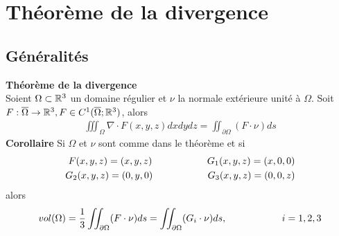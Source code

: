 \chapter[Théorème de la divergence]{Théorème de la divergence}

\section{Généralités}

\begin{myTheorem} {\bf Théorème de la divergence}
\\
	Soient $\Omega \subset \mathbb{R}^3$ un domaine régulier et $\nu$ la normale extérieure unité à $\Omega$. Soit $F:\overline{\Omega}\rightarrow\mathbb{R}^3, F\in C^1(\overline{\Omega};\mathbb{R}^3)$, alors
	\begin{eqnarray*}
		\iiint_\Omega \nabla\cdot F(x,y,z)dxdydz=\iint_{\partial\Omega}(F\cdot\nu)ds
	\end{eqnarray*}
	{\bf Corollaire} Si $\Omega$ et $\nu$ sont comme dans le théorème et si
	\begin{eqnarray*}
		F(x,y,z)=(x,y,z)\hspace{20 mm}G_1(x,y,z)=(x,0,0)
		\\
		G_2(x,y,z)=(0,y,0)\hspace{20 mm}G_3(x,y,z)=(0,0,z)
	\end{eqnarray*}
	alors
	\begin{eqnarray*}
		vol(\Omega)=\frac{1}{3}\iint_{\partial\Omega}(F\cdot\nu)ds=\iint_{\partial\Omega}(G_i\cdot\nu)ds, \hspace{20 mm}i=1,2,3
	\end{eqnarray*}
\end{myTheorem}

